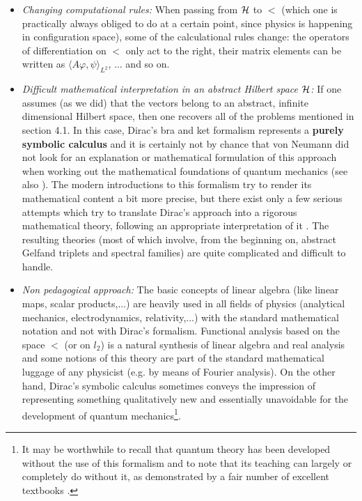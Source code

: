 \documentclass[12pt]{report}
\begin{document}
\begin{itemize}
\item
{\em Changing computational rules:}
When passing from ${\cal H}$ to $\lt$
(which one is practically always obliged to do at a certain point, 
since physics is happening in configuration space), 
some of the calculational rules change: the operators 
of differentiation on $\lt$ only act to the right, 
their matrix elements can be written as 
$\langle A \varphi , \psi \rangle _{L^2}$, ... and so on. 
 
\item {\em Difficult mathematical interpretation in an abstract 
Hilbert space ${\cal H}$:}
If one assumes (as we did) that the vectors belong to 
an abstract, infinite dimensional Hilbert space, 
then one recovers all of the problems mentioned 
in section 4.1. 
In this case, Dirac's bra and ket formalism represents a 
{\bf purely symbolic calculus} and it is certainly not 
by chance that von Neumann did not look for an explanation 
or mathematical formulation of this approach 
when working out the mathematical foundations of quantum mechanics
\cite{jvn} (see also \cite{stone}). 
The modern introductions to this formalism 
try to render its mathematical content a bit more precise, 
but there exist only a few serious attempts which try to 
translate Dirac's approach into a rigorous mathematical theory, 
following an appropriate interpretation of it 
\cite{jr,jpa,ein,gl,jau}.
The resulting theories (most of which involve,  
from the beginning on,  
abstract Gelfand triplets and spectral families) 
are quite complicated and difficult to handle. 
 
\item
{\em Non pedagogical approach:}
The basic concepts of linear algebra (like linear maps, 
scalar products,...) are heavily used in all fields of physics 
(analytical mechanics, electrodynamics, relativity,...) 
with the standard mathematical notation and not with Dirac's 
formalism. Functional analysis based on the space 
$\lt$ (or on $l_2$) is a natural synthesis of linear algebra 
and real analysis and some notions of this theory are part
of the standard mathematical luggage of any physicist
(e.g. by means of Fourier analysis). 
On the other hand, Dirac's symbolic calculus sometimes conveys  
the impression of representing something qualitatively new 
and essentially unavoidable for the development of quantum 
mechanics\footnote{It may be worthwhile to recall that quantum 
theory has been developed without the use of this formalism 
\cite{vdw} and to note that its teaching can largely or 
completely do without it, as demonstrated by a fair number of excellent 
textbooks \cite{gap,ll,pd}.}.
\end{itemize}
\end{document}
